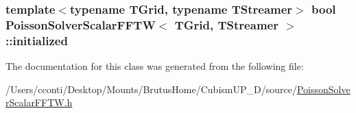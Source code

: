 \subsubsection[{initialized}]{\setlength{\rightskip}{0pt plus 5cm}template$<$typename T\+Grid, typename T\+Streamer$>$ bool {\bf Poisson\+Solver\+Scalar\+F\+F\+T\+W}$<$ T\+Grid, T\+Streamer $>$\+::initialized\hspace{0.3cm}{\ttfamily [protected]}}\label{class_poisson_solver_scalar_f_f_t_w_a14ffa693193fcc1d5391c452dcf11d34}


The documentation for this class was generated from the following file\+:\begin{DoxyCompactItemize}
\item 
/\+Users/cconti/\+Desktop/\+Mounts/\+Brutus\+Home/\+Cubism\+U\+P\+\_\+D/source/\hyperlink{_poisson_solver_scalar_f_f_t_w_8h}{Poisson\+Solver\+Scalar\+F\+F\+T\+W.\+h}\end{DoxyCompactItemize}
